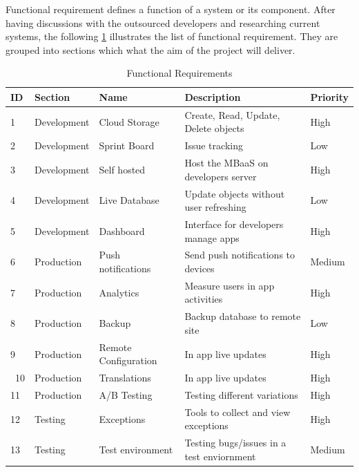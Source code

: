 Functional requirement defines a function of a system or its component. After having discussions with the outsourced developers and researching current systems, the following \ref{tb:functional} illustrates the list of functional requirement. They are grouped into sections which what the aim of the project will deliver.

\begin{table}[!h]
\centering
\caption{Functional Requirements}
\label{tb:functional}
\begin{tabular}{|l|l|l|l|l|}
\hline
\cellcolor{green!20}ID & \cellcolor{green!20}Section  & \cellcolor{green!20}Name  & \cellcolor{green!20}Description        & \cellcolor{green!20}Priority \\ \hline
1                      & Development                  & Cloud Storage             & Create, Read, Update, Delete objects   & High   \\ \hline
2                      & Development                  & Sprint Board              & Issue tracking   & Low   \\ \hline
3                      & Development                  & Self hosted               & Host the MBaaS on developers server    & High   \\ \hline
4                      & Development                  & Live Database             & Update objects without user refreshing & Low    \\ \hline
5                      & Development                  & Dashboard                 & Interface for developers manage apps   & High   \\ \hline
6                      & Production                   & Push notifications        & Send push notifications to devices     & Medium \\ \hline
7                      & Production                   & Analytics                 & Measure users in app activities        & High   \\ \hline
8                      & Production                   & Backup                    & Backup database to remote site         & Low    \\ \hline
9                      & Production                   & Remote Configuration      & In app live updates                    & High   \\ \
10                      & Production                   & Translations              & In app live updates                    & High   \\ \hline
11                      & Production                   & A/B Testing               & Testing different variations           & High   \\ \hline
12                     & Testing                      & Exceptions                & Tools to collect and view exceptions   & High   \\ \hline
13                     & Testing                      & Test environment          & Testing bugs/issues in a test enviornment & Medium \\ \hline
\end{tabular}
\end{table}

